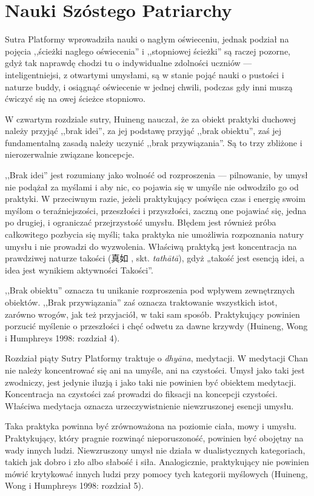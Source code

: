 \section{Nauki Szóstego Patriarchy}

Sutra Platformy wprowadziła nauki o nagłym oświeceniu, jednak podział na pojęcia ,,ścieżki nagłego oświecenia'' i ,,stopniowej ścieżki'' są raczej pozorne, gdyż tak naprawdę chodzi tu o indywidualne zdolności uczniów --- inteligentniejsi, z otwartymi umysłami, są w stanie pojąć nauki o pustości i naturze buddy, i osiągnąć oświecenie w jednej chwili, podczas gdy inni muszą ćwiczyć się na owej ścieżce stopniowo.

W czwartym rozdziale sutry, Huineng nauczał, że za obiekt praktyki duchowej należy przyjąć ,,brak idei'', za jej podstawę przyjąć ,,brak obiektu'', zaś jej fundamentalną zasadą należy uczynić ,,brak przywiązania''. Są to trzy zbliżone i nierozerwalnie związane koncepcje.

,,Brak idei'' jest rozumiany jako wolność od rozproszenia --- pilnowanie, by umysł nie podążał za myślami i aby nic, co pojawia się w umyśle nie odwodziło go od praktyki. W przeciwnym razie, jeżeli praktykujący poświęca czas i energię swoim myślom o teraźniejszości, przeszłości i przyszłości, zaczną one pojawiać się, jedna po drugiej, i ograniczać przejrzystość umysłu. Błędem jest również próba całkowitego pozbycia się myśli; taka praktyka nie umożliwia rozpoznania natury umysłu i nie prowadzi do wyzwolenia. Właściwą praktyką jest koncentracja na prawdziwej naturze takości (真如 , skt. \textit{tathātā}), gdyż „takość jest esencją idei, a idea jest wynikiem aktywności Takości”.

,,Brak obiektu'' oznacza tu unikanie rozproszenia pod wpływem zewnętrznych obiektów. ,,Brak przywiązania'' zaś oznacza traktowanie wszystkich istot, zarówno wrogów, jak też przyjaciół, w taki sam sposób. Praktykujący powinien porzucić myślenie o przeszłości i chęć odwetu za dawne krzywdy (Huineng, Wong i Humphreys 1998: rozdział 4).

Rozdział piąty Sutry Platformy traktuje o \textit{dhyāna}, medytacji. W medytacji Chan nie należy koncentrować się ani na umyśle, ani na czystości. Umysł jako taki jest zwodniczy, jest jedynie iluzją i jako taki nie powinien być obiektem medytacji. Koncentracja na czystości zaś prowadzi do fiksacji na koncepcji czystości. Właściwa medytacja oznacza urzeczywistnienie niewzruszonej esencji umysłu.

Taka praktyka powinna być zrównoważona na poziomie ciała, mowy i umysłu. Praktykujący, który pragnie rozwinąć nieporuszoność, powinien być obojętny na wady innych ludzi. Niewzruszony umysł nie działa w dualistycznych kategoriach, takich jak dobro i zło albo słabość i siła. Analogicznie, praktykujący nie powinien mówić krytykować innych ludzi przy pomocy tych kategorii myślowych (Huineng, Wong i Humphreys 1998: rozdział 5).

